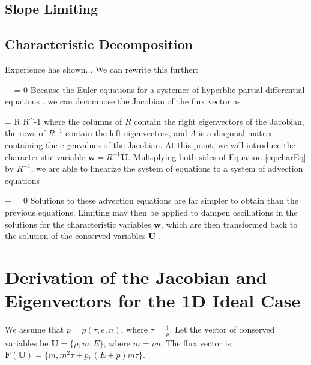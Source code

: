 \documentclass[twocolumn]{aastex62}
\begin{document}
\subsection{Slope Limiting}




\subsection{Characteristic Decomposition}
Experience has shown...
We can rewrite this further:

\beq
  +  
  = 0
  \label{eq:charEq}
\eeq
Because the Euler equations for a systemer of hyperblic
partial differential equations \citep[see, e.g.,][]{leveque:1992}, we can decompose the
Jacobian of the flux vector as

\beq
   =
  R \Lambda R^{-1}
\eeq
where the columns of $R$ contain the right eigenvectors of the Jacobian,
the rows of $R^{-1}$ contain the left eigenvectors, and
$\Lambda$ is a diagonal matrix containing the eigenvalues of the Jacobian.
At this point, we will introduce the characteristic variable
$\mathbf{w} = R^{-1}\mathbf{U}$. Multiplying both sides of Equation
\eqref{eq:charEq} by $R^{-1}$, we are able to linearize the system of equations to
a system of advection equations

\beq
   +
  \Lambda {}
  = 0
\eeq
Solutions to these advection equations are far simpler to obtain than the
previous equations. Limiting may then be applied to dampen oscillations in the
solutions for the characteristic variables $\mathbf{w}$, which are then
transformed back to the solution of the conserved variables $\mathbf{U}$
\citep[see e.g.,][for a description]{cockburn:1998, schaal:2015a}.


\hrulefill

\section{Derivation of the Jacobian and Eigenvectors for the 1D Ideal Case}


We assume that $p = p(\tau, e, n)$, where $\tau = \frac{1}{\rho}$. Let the vector of conserved variables be $\textbf{U} = \{\rho, m, E\}$,
where $m = \rho u$. The flux vector is $\textbf{F}(\textbf{U}) = \{m, m^{2} \tau + p, (E+p)m \tau\}$.
\end{document}
